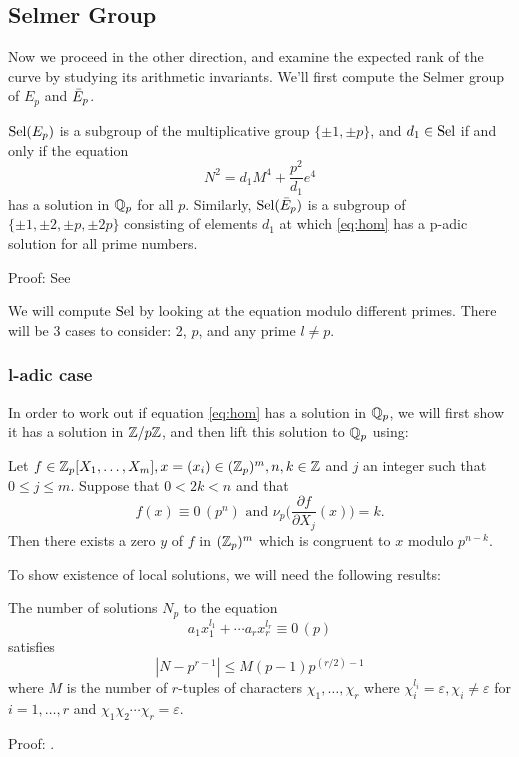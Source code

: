 \documentclass[12pt, a4paper]{amsart}
\begin{document}
\subsection{Selmer Group}

Now we proceed in the other direction, and examine the expected rank of the
curve by studying its arithmetic invariants. We'll first compute the Selmer
group of $E_p$ and $\bar{E}_p$.

\begin{prop}
  $\text{\normalfont Sel}(E_p)$ is a subgroup of the multiplicative group
  $ \{ \pm 1, \pm p \}$, and $d_1 \in \text{\normalfont Sel}$ if and only if the equation
  \begin{equation} \label{eq:hom}
    N^2 = d_1 M^4 + \frac{p^2}{d_1}e^4
  \end{equation}
  has a solution in ${\mathbb Q}_p$ for all $p$.
  Similarly, $\text{\normalfont Sel}(\bar{E}_p)$ is a subgroup of $\{\pm 1, \pm 2, \pm p, \pm 2p\}$
  consisting of elements $d_1$ at which \ref{eq:hom} has a p-adic solution for
  all prime numbers.
\end{prop}
Proof: See \cite{rational}

We will compute $\text{\normalfont Sel}$ by looking at the equation modulo different primes.
There will be 3 cases to consider: 2, $p$, and any prime $l \neq p$.

\subsubsection{l-adic case}

In order to work out if equation \ref{eq:hom} has a solution in ${\mathbb Q}_p$,
we will first show it has a solution 
in ${\mathbb Z}/p{\mathbb Z}$, and then lift this solution to ${\mathbb Q}_p$ using:

\begin{prop}
  Let $f \in {\mathbb Z}_p[X_1,\dots,X_m], x = (x_i) \in ({\mathbb Z}_p)^m, n, k \in {\mathbb Z}$ and
  $j$ an integer such that $0 \leq j \leq m$. Suppose that $0 < 2k < n$ and that
  \[ f(x) \equiv 0 \, (p^n) \text { and } \nu_p
    \big(\frac{\partial f}{\partial X_j} (x) \big) = k.\]
  Then there exists a zero $y$ of $f$ in $({\mathbb Z}_p)^m$ which is congruent to $x$
  modulo $p^{n-k}$.
\end{prop}

To show existence of local solutions, we will need the following results: 

\begin{prop} 
  The number of solutions $N_p$ to the equation
  \[a_1x_1^{l_1} + \cdots a_rx_r^{l_r} \equiv 0 \, (p)\]
  satisfies
  \begin{equation} 
    |N - p^{r-1}| \leq M(p-1)p^{(r/2)-1}
  \end{equation} 
  where $M$ is the number of $r$-tuples
  of characters \linebreak
  $\chi_1, \dots , \chi_r$
  where $\chi_i^{l_i} = \varepsilon, \chi_i \neq \varepsilon$ for
  $i = 1, \dots, r$ and $\chi_1 \chi_2 \cdots \chi_r = \varepsilon$.
\end{prop} \label{prop:countsols}
Proof: \cite[See][]{classical}.
\end{document}
